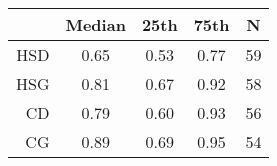 \begin{tabular}{rSSSS}
\hline
 & Median & 25th & 75th & N \\ 
\hline
HSD & 0.65 & 0.53 & 0.77 & 59 \\ 
HSG & 0.81 & 0.67 & 0.92 & 58 \\ 
CD & 0.79 & 0.60 & 0.93 & 56 \\ 
CG & 0.89 & 0.69 & 0.95 & 54 \\ 
\hline
\end{tabular}%
